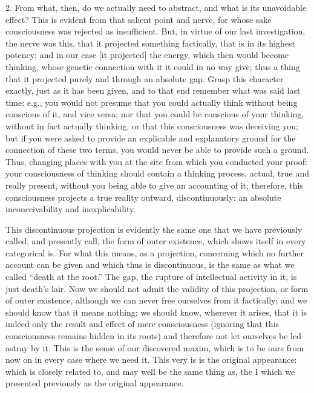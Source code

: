 2. From what, then, do we actually need to abstract,
and what is its unavoidable effect?
This is evident from that salient point and nerve,
for whose sake consciousness was rejected as insufficient.
But, in virtue of our last investigation, the nerve was this,
that it projected something factically,
that is in its highest potency;
and in our case [it projected] the energy,
which then would become thinking,
whose genetic connection with it
it could in no way give;
thus a thing that it projected
purely and through an absolute gap.
Grasp this character exactly,
just as it has been given, and
to that end remember what was said last time:
e.g., you would not presume
that you could actually think
without being conscious of it,
and vice versa;
nor that you could be conscious of your thinking,
without in fact actually thinking,
or that this consciousness was deceiving you;
but if you were asked to provide
an explicable and explanatory ground
for the connection of these two terms,
you would never be able to provide such a ground.
Thus, changing places with you at the site
from which you conducted your proof:
your consciousness of thinking should
contain a thinking process,
actual, true and really present,
without you being able to give an accounting of it;
therefore, this consciousness projects
a true reality outward, discontinuously:
an absolute inconceivability and inexplicability.

This discontinuous projection is evidently
the same one that we have previously called,
and presently call, the form of outer existence,
which shows itself in every categorical is.
For what this means, as a projection,
concerning which no further account can be given
and which thus is discontinuous,
is the same as what we called “death at the root.”
The gap, the rupture of intellectual activity in it,
is just death’s lair.
Now we should not admit the validity of this projection,
or form of outer existence,
although we can never free ourselves from it factically;
and we should know that it means nothing;
we should know, wherever it arises,
that it is indeed only the result
and effect of mere consciousness
(ignoring that this consciousness
remains hidden in its roots)
and therefore not let ourselves
be led astray by it.
This is the sense of our discovered maxim,
which is to be ours from now on in every case
where we need it.
This very is is the original appearance:
which is closely related to,
and may well be the same thing as,
the I which we presented previously
as the original appearance.

